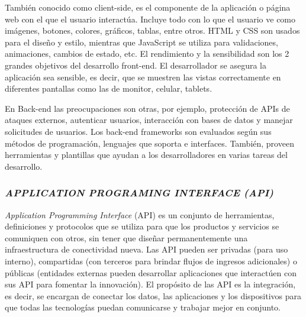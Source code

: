 
También conocido como client-side, es el componente de la aplicación o página web con el que el usuario interactúa. Incluye todo con lo que el usuario ve como imágenes, botones, colores, gráficos, tablas, entre otros. HTML y CSS son usados para el diseño y estilo, mientras que JavaScript se utiliza para validaciones, animaciones, cambios de estado, etc. El rendimiento y la sensibilidad son los 2 grandes objetivos del desarrollo front-end. El desarrollador se asegura la aplicación sea sensible, es decir, que se muestren las vistas correctamente en diferentes pantallas como las de monitor, celular, tablets. \cite{webframedbws}


En Back-end las preocupaciones son otras, por ejemplo, protección de APIs de ataques externos, autenticar usuarios, interacción con bases de datos y manejar solicitudes de usuarios. Los back-end frameworks son evaluados según sus métodos de programación, lenguajes que soporta e interfaces. También, proveen herramientas y plantillas que ayudan a los desarrolladores en varias tareas del desarrollo. \cite{webframedbws}

\subsubsection{\textit{APPLICATION PROGRAMING INTERFACE (API)}}

\textit{Application Programming Interface} (API) es un conjunto de herramientas, definiciones y protocolos que se utiliza para que los productos y servicios se comuniquen con otros, sin tener que diseñar permanentemente una infraestructura de conectividad nueva. Las API pueden ser privadas (para uso interno), compartidas (con terceros para brindar flujos de ingresos adicionales) o públicas (entidades externas pueden desarrollar aplicaciones que interactúen con sus API para fomentar la innovación).
El propósito de las API es la integración, es decir, se encargan de conectar los datos, las aplicaciones y los dispositivos para que todas las tecnologías puedan comunicarse y trabajar mejor en conjunto.


